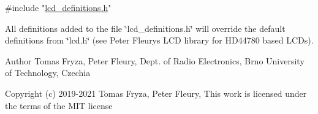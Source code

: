 \begin{DoxyCode}
\textcolor{preprocessor}{#include "\hyperlink{a00003}{lcd\_definitions.h}"} 
\end{DoxyCode}


All definitions added to the file \char`\"{}lcd\+\_\+definitions.\+h\char`\"{} will override the default definitions from \char`\"{}lcd.\+h\char`\"{} (see Peter Fleury\textquotesingle{}s L\+CD library for H\+D44780 based L\+C\+Ds).

\begin{DoxyAuthor}{Author}
Tomas Fryza, Peter Fleury, Dept. of Radio Electronics, Brno University of Technology, Czechia 
\end{DoxyAuthor}
\begin{DoxyCopyright}{Copyright}
(c) 2019-\/2021 Tomas Fryza, Peter Fleury, This work is licensed under the terms of the M\+IT license 
\end{DoxyCopyright}
